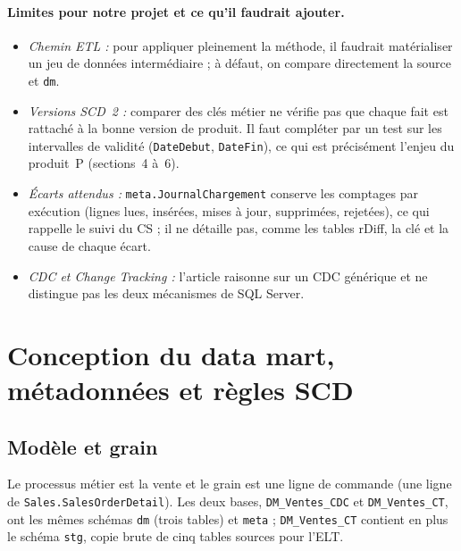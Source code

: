 \documentclass[10pt,a4paper]{article}
\begin{document}
\paragraph{Limites pour notre projet et ce qu'il faudrait ajouter.}
\begin{itemize}
  \item \emph{Chemin ETL :} pour appliquer pleinement la méthode, il faudrait matérialiser un jeu de données intermédiaire ; à défaut, on compare directement la source et \texttt{dm}.
  \item \emph{Versions SCD~2 :} comparer des clés métier ne vérifie pas que chaque fait est rattaché à la bonne version de produit. Il faut compléter par un test sur les intervalles de validité (\texttt{DateDebut}, \texttt{DateFin}), ce qui est précisément l'enjeu du produit~P (sections~4 à~6).
  \item \emph{Écarts attendus :} \texttt{meta.JournalChargement} conserve les comptages par exécution (lignes lues, insérées, mises à jour, supprimées, rejetées), ce qui rappelle le suivi du CS ; il ne détaille pas, comme les tables rDiff, la clé et la cause de chaque écart.
  \item \emph{CDC et Change Tracking :} l'article raisonne sur un CDC générique et ne distingue pas les deux mécanismes de SQL Server.
\end{itemize}

\section{Conception du data mart, métadonnées et règles SCD}

\subsection{Modèle et grain}

Le processus métier est la vente et le grain est une ligne de commande (une ligne de \texttt{Sales.SalesOrderDetail}). Les deux bases, \texttt{DM\_Ventes\_CDC} et \texttt{DM\_Ventes\_CT}, ont les mêmes schémas \texttt{dm} (trois tables) et \texttt{meta} ; \texttt{DM\_Ventes\_CT} contient en plus le schéma \texttt{stg}, copie brute de cinq tables sources pour l'ELT.
\end{document}
